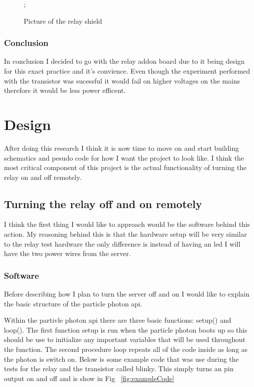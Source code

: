 \documentclass{article}
\begin{document}
\begin{figure}[H]
    \noindent{};
    \caption{Picture of the relay shield} \label{fig:relayShield}
\end{figure}

\subsubsection{Conclusion}
In conclusion I decided to go with the relay addon board due to it being design for this exact practice and
it's convience. Even though the experiment performed with the transistor was sucessful it would fail on
higher voltages on the mains therefore it would be less power efficent.

\section{Design}

After doing this research I think it is now time to move on and start building schematics and pesudo code
for how I want the project to look like. I think the most critical component of this project is the
actual functionality of turning the relay on and off remotely.

\subsection{Turning the relay off and on remotely}
I think the first thing I would like to approach would be the software behind this action. My reasoning
behind this is that the hardware setup will be very similar to the relay test hardware the only difference
is instead of having an led I will have the two power wires from the server.

\subsubsection{Software}
Before describing how I plan to turn the server off and on I would like to explain the basic structure of
the particle photon api.

Within the partivle photon api there are three basic functions: setup() and loop(). The first function
setup is run when the particle photon boots up so this should be use to initialize any important variables
that will be used throughout the function. The second procedure loop repeats all of the code inside as long
as the photon is switch on. Below is some example code that was use during the tests for the relay and the
transistor called blinky. This simply turns an pin output on and off and is show in Fig ~\ref{fig:exampleCode}
\end{document}
